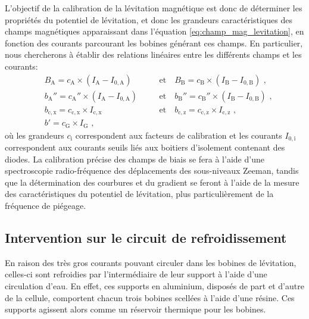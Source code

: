 L'objectif de la calibration de la lévitation magnétique est donc de déterminer les propriétés du potentiel de lévitation, et donc les grandeurs caractéristiques des champs magnétiques apparaissant dans l'équation \ref{eq:champ_mag_levitation}, en fonction des courants parcourant les bobines générant ces champs. En particulier, nous chercherons à établir des relations linéaires entre les différents champs et les courants:
\begin{align}
&B_{\mathrm{A}}=c_{\mathrm{A}} \times (I_{\mathrm{A}}-I_{\mathrm{0,A}}) \quad &&\text{et}\quad B_{\mathrm{B}}=c_{\mathrm{B}} \times (I_{\mathrm{B}}-I_{\mathrm{0,B}}) \text{ ,}\label{eq:calibration_biais_lev}\\
&b_{\mathrm{A}}'' = c_{\mathrm{A}}'' \times (I_{\mathrm{A}}-I_{\mathrm{0,A}}) \quad &&\text{et} \quad b_{\mathrm{B}}'' = c_{\mathrm{B}}'' \times (I_{\mathrm{B}}-I_{\mathrm{0,B}}) \text{ ,}\label{eq:calibration_courbure_lev}\\
&b_{\mathrm{c,x}}=c_{\mathrm{c,x}} \times I_{\mathrm{c,x}} \quad &&\text{et}\quad b_{\mathrm{c,z}}= c_{\mathrm{c,z}} \times I_{\mathrm{c,z}} \text{ ,}\label{eq:calibration_biais_comp}\\
&b'= c_{\mathrm{G}} \times I_{\mathrm{G}} \text{ ,}\label{eq:calibration_gradient} && 
\end{align}
où les grandeurs $c_{\mathrm{i}}$ correspondent aux facteurs de calibration et les courants $I_{\mathrm{0,i}}$ correspondent aux courants seuils liés aux boitiers d'isolement contenant des diodes. La calibration précise des champs de biais se fera à l'aide d'une spectroscopie radio-fréquence des déplacements des sous-niveaux Zeeman, tandis que la détermination des courbures et du gradient se feront à l'aide de la mesure des caractéristiques du potentiel de lévitation, plus particulièrement de la fréquence de piégeage.



\subsection{Intervention sur le circuit de refroidissement}
En raison des très gros courants pouvant circuler dans les bobines de lévitation, celles-ci sont refroidies par l'intermédiaire de leur support à l'aide d'une circulation d'eau. En effet, ces supports en aluminium, disposés de part et d'autre de la cellule, comportent chacun trois bobines scellées à l'aide d'une résine. Ces supports agissent alors comme un réservoir thermique pour les bobines.

